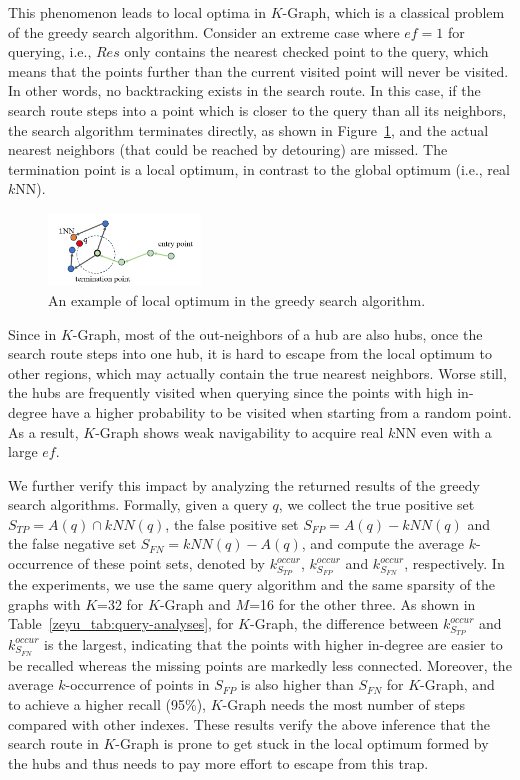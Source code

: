\documentclass[11pt]{article}
\begin{document}
This phenomenon leads to local optima in $K$-Graph, which is a classical problem of the greedy search algorithm.
Consider an extreme case where $ef=1$ for querying, i.e., $Res$ only contains the nearest checked point to the query, which means that the points further than the current visited point will never be visited.
In other words, no backtracking exists in the search route.
In this case, if the search route steps into a point which is closer to the query than all its neighbors, the search algorithm terminates directly, as shown in Figure~\ref{zeyu_fig:local-optimum}, and the actual nearest neighbors (that could be reached by detouring) are missed.
The termination point is a local optimum, in contrast to the global optimum (i.e., real $k$NN).
\begin{figure}
    \centering
    \includegraphics[width=0.36\textwidth]{submissions/Zeyu2023/figs/local-optimum.png}
    \caption{An example of local optimum in the greedy search algorithm.}
    \label{zeyu_fig:local-optimum}
\end{figure}
Since in $K$-Graph, most of the out-neighbors of a hub are also hubs, once the search route steps into one hub, it is hard to escape from the local optimum to other regions, which may actually contain the true nearest neighbors.
Worse still, the hubs are frequently visited when querying since the points with high in-degree have a higher probability to be visited when starting from a random point.
As a result, $K$-Graph shows weak navigability to acquire real $k$NN even with a large $ef$.

We further verify this impact by analyzing the returned results of the greedy search algorithms.
Formally, given a query $q$, we collect the true positive set $S_{TP} = A(q) \cap kNN(q)$, the false positive set $S_{FP} = A(q) - kNN(q)$ and the false negative set $S_{FN} = kNN(q) - A(q)$, and compute the average $k$-occurrence of these point sets, denoted by $k^{occur}_{S_{TP}}$, $k^{occur}_{S_{FP}}$ and $k^{occur}_{S_{FN}}$, respectively.
In the experiments, we use the same query algorithm and the same sparsity of the graphs with $K$=32 for $K$-Graph and $M$=16 for the other three.
As shown in Table~\ref{zeyu_tab:query-analyses}, for $K$-Graph, the difference between $k^{occur}_{S_{TP}}$ and $k^{occur}_{S_{FN}}$ is the largest, indicating that the points with higher in-degree are easier to be recalled whereas the missing points are markedly less connected.
Moreover, the average $k$-occurrence of points in $S_{FP}$ is also higher than $S_{FN}$ for $K$-Graph, and to achieve a higher recall (95\%), $K$-Graph needs the most number of steps compared with other indexes.
These results verify the above inference that the search route in $K$-Graph is prone to get stuck in the local optimum formed by the hubs and thus needs to pay more effort to escape from this trap.
\end{document}

